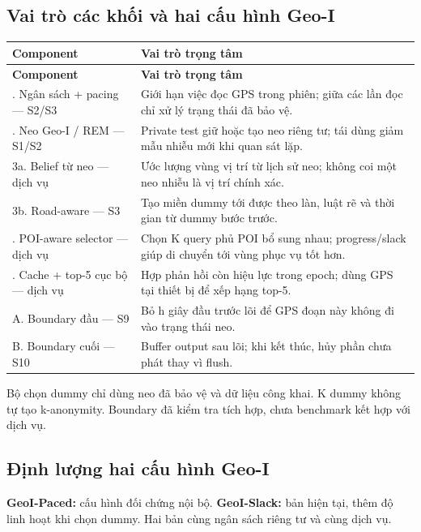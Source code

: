 \documentclass[10pt,a4paper]{article}
\begin{document}
\subsection{Vai trò các khối và hai cấu hình Geo-I}\label{sub:2.1}
\begingroup\small
\begin{longtable}{@{}P{5.006cm}P{11.913cm}@{}}
\toprule
\textbf{Component} & \textbf{Vai trò trọng tâm}\\\midrule
\endfirsthead
\toprule
\textbf{Component} & \textbf{Vai trò trọng tâm}\\\midrule
\endhead
\bottomrule{}. Ngân sách + pacing — S2/S3 & Giới hạn việc đọc GPS trong phiên; giữa các lần đọc chỉ xử lý trạng thái đã bảo vệ.\\
. Neo Geo-I / REM — S1/S2 & Private test giữ hoặc tạo neo riêng tư; tái dùng giảm mẫu nhiễu mới khi quan sát lặp.\\
\addlinespace[3pt]
3a. Belief từ neo — dịch vụ & Ước lượng vùng vị trí từ lịch sử neo; không coi một neo nhiễu là vị trí chính xác.\\
\addlinespace[3pt]
3b. Road-aware — S3 & Tạo miền dummy tới được theo làn, luật rẽ và thời gian từ dummy bước trước.\\
. POI-aware selector — dịch vụ & Chọn K query phủ POI bổ sung nhau; progress/slack giúp di chuyển tới vùng phục vụ tốt hơn.\\
. Cache + top-5 cục bộ — dịch vụ & Hợp phản hồi còn hiệu lực trong epoch; dùng GPS tại thiết bị để xếp hạng top-5.\\
\addlinespace[3pt]
A. Boundary đầu — S9 & Bỏ h giây đầu trước lõi để GPS đoạn này không đi vào trạng thái neo.\\
\addlinespace[3pt]
B. Boundary cuối — S10 & Buffer output sau lõi; khi kết thúc, hủy phần chưa phát thay vì flush.\\
\end{longtable}
\endgroup
Bộ chọn dummy chỉ dùng neo đã bảo vệ và dữ liệu công khai. K dummy không tự tạo k-anonymity. Boundary đã kiểm tra tích hợp, chưa benchmark kết hợp với dịch vụ.

\subsection{Định lượng hai cấu hình Geo-I}\label{sub:2.2}
\textbf{GeoI-Paced:} cấu hình đối chứng nội bộ. \textbf{GeoI-Slack:} bản hiện tại, thêm độ linh hoạt khi chọn dummy. Hai bản cùng ngân sách riêng tư và cùng dịch vụ.
\end{document}
